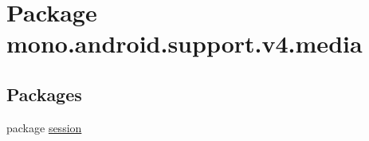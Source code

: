 \hypertarget{namespacemono_1_1android_1_1support_1_1v4_1_1media}{
\section{Package mono.android.support.v4.media}
\label{namespacemono_1_1android_1_1support_1_1v4_1_1media}
}
\subsection*{Packages}
\begin{CompactItemize}
\item 
package \hyperlink{namespacemono_1_1android_1_1support_1_1v4_1_1media_1_1session}{session}
\end{CompactItemize}
